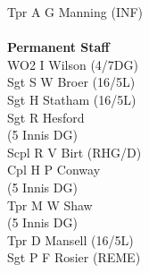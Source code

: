 \begin{multicols}{4}
  Tpr A G Manning (INF) \\
  \\
  \textbf{Permanent Staff} \\
  WO2 I Wilson (4/7DG) \\
  Sgt S W Broer (16/5L) \\
  Sgt H Statham (16/5L) \\
  Sgt R Hesford \\ \indent (5 Innis DG) \\
  Scpl R V Birt (RHG/D) \\
  Cpl H P Conway \\ \indent (5 Innis DG) \\
  Tpr M W Shaw \\ \indent (5 Innis DG) \\
  Tpr D Mansell (16/5L) \\
  Sgt P F Rosier (REME)
\end{multicols}

\pagebreak
